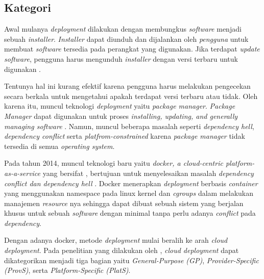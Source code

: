 \subsection{Kategori}

Awal mulanya \textit{deployment} dilakukan dengan membungkus \textit{software} menjadi sebuah \textit{installer}. \textit{Installer} dapat diunduh dan dijalankan oleh \textit{pengguna} untuk membuat \textit{software} tersedia pada perangkat yang digunakan. Jika terdapat \textit{update software}, pengguna harus mengunduh \textit{installer} dengan versi terbaru untuk digunakan \parencite{softwareDeploymentCarzaniga1998characterization}. 

Tentunya hal ini kurang efektif karena pengguna harus melakukan pengecekan secara berkala untuk mengetahui apakah terdapat versi terbaru atau tidak. Oleh karena itu, muncul teknologi \textit{deployment} yaitu \textit{package manager}. \textit{Package Manager} dapat digunakan untuk proses \textit{installing, updating, and generally managing software} \parencite{softwareDeploymentCarzaniga1998characterization}. Namun, muncul beberapa masalah seperti \textit{dependency hell}, \textit{dependency conflict} serta \textit{platfrom-constrained} karena \textit{package manager} tidak tersedia di semua \textit{operating system}. 

Pada tahun 2014, muncul teknologi baru yaitu \textit{docker, a cloud-centric platform-as-a-service} yang bersifat \textit{}, bertujuan untuk menyelesaikan masalah \textit{dependency conflict dan dependency hell} \parencite{merkel2014docker}. Docker menerapkan \textit{deployment} berbasis \textit{container} yang menggunakan namespace pada linux kernel dan \textit{cgroups} dalam melakukan manajemen \textit{resource} nya sehingga dapat dibuat sebuah sistem yang berjalan khusus untuk sebuah \textit{software} dengan minimal tanpa perlu adanya \textit{conflict} pada \textit{dependency}. 

Dengan adanya docker, metode \textit{deployment} mulai beralih ke arah \textit{cloud deployment}. Pada penelitian yang dilakukan oleh \parencite{wurster2020essential}, \textit{cloud deployment} dapat dikategorikan menjadi tiga bagian yaitu \textit{General-Purpose (GP)}, \textit{Provider-Specific (ProvS)}, serta \textit{Platform-Specific (PlatS)}.

